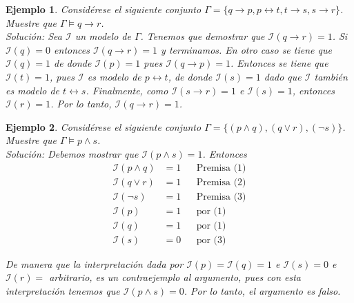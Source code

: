 \documentclass[letterpaper,12pt]{article}
\newtheorem{ejem}{Ejemplo}[]
\begin{document}
    \begin{ejem}
        Considérese el siguiente conjunto 
        $\Gamma = \{ q \rightarrow p, p \leftrightarrow t, t \rightarrow s,
        s \rightarrow r\}$. Muestre que $\Gamma \models q \rightarrow r$. \\
        \textit{Solución:} Sea $\mathcal{I}$ un modelo de $\Gamma$. Tenemos 
        que demostrar que $\mathcal{I}(q \rightarrow r) = 1$. Si 
        $\mathcal{I}(q) = 0$ entonces $\mathcal{I}(q \rightarrow r) = 1$ y 
        terminamos. En otro caso se tiene que $\mathcal{I}(q) = 1$ de donde 
        $\mathcal{I}(p) = 1$ pues $\mathcal{I}(q \rightarrow p) = 1$. Entonces
        se tiene que $\mathcal{I}(t) = 1$, pues $\mathcal{I}$ es modelo de 
        $p \leftrightarrow t$, de donde $\mathcal{I}(s) = 1$ dado que 
        $\mathcal{I}$ también es modelo de $t \leftrightarrow s$. Finalmente,
        como $\mathcal{I}(s \rightarrow r) = 1$ e $\mathcal{I}(s) = 1$, 
        entonces $\mathcal{I}(r) = 1$. Por lo tanto, 
        $\mathcal{I}(q \rightarrow r) = 1$. 
    \end{ejem}
    
    \begin{ejem}
        Considérese el siguiente conjunto 
        $\Gamma = \{ (p \land q), (q \lor r), (\neg s) \}$. Muestre que 
        $ \Gamma \models p \land s$. \\
        \textit{Solución:} Debemos mostrar que $\mathcal{I}(p \land s) = 1$.
        Entonces 
        \begin{align*}
            \mathcal{I}(p \land q) &= 1
            && \text{Premisa (1)} \\
            \mathcal{I}(q \lor r) &= 1
            && \text{Premisa (2)} \\
            \mathcal{I}(\neg s) &= 1 
            && \text{Premisa (3)} \\
            \mathcal{I}(p) &= 1
            && \text{por (1)} \\
            \mathcal{I}(q) &= 1
            && \text{por (1)} \\
            \mathcal{I}(s) &= 0
            && \text{por (3)}
        \end{align*}

        De manera que la interpretación dada por 
        $\mathcal{I}(p) = \mathcal{I}(q) = 1$ e $\mathcal{I}(s) = 0$ e 
        $\mathcal{I}(r) =$ arbitrario, es un contraejemplo al argumento, pues 
        con esta interpretación tenemos que $\mathcal{I}(p \land s) = 0$.
        Por lo tanto, el argumento es falso.
    \end{ejem}
\end{document}
